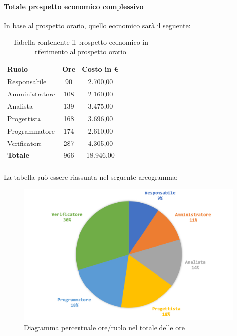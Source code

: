 			\paragraph{Totale prospetto economico complessivo}
			In base al prospetto orario, quello economico sarà il seguente: 
			
			\begin{longtable}{|l|c|c|c|c|c|c|c|}
				\hline
				\rowcolor{lighter-grayer}
				\textbf{Ruolo} & \textbf{Ore} & \textbf{Costo in € } \\
				\hline
				\endfirsthead
				
				\hline
				Responsabile 	    & 90 & 2.700,00\\
				\hline 
				\hline
				Amministratore	  & 108 & 2.160,00\\
				\hline
				\hline
				Analista 				& 139 & 3.475,00\\
				\hline
				\hline
				Progettista 		  & 168 & 3.696,00\\
				\hline
				\hline
				Programmatore 	 & 174 & 2.610,00\\
				\hline
				\hline
				Verificatore 		  & 287 & 4.305,00\\
				\hline
				\textbf{Totale} 	& 966 & 18.946,00\\
				\hline
				\caption{Tabella contenente il prospetto economico in riferimento al prospetto orario}
			\end{longtable}
			
			La tabella può essere riassunta nel seguente areogramma:
			\begin{figure}[H]
				\centering
				\includegraphics[width=0.8\linewidth]{./images/preventivo/totOre2.png}
				\caption{Diagramma percentuale ore/ruolo nel totale delle ore}
				\label{fig:diagramma costi ruolo fase totale ore}
			\end{figure}
			\pagebreak
		
